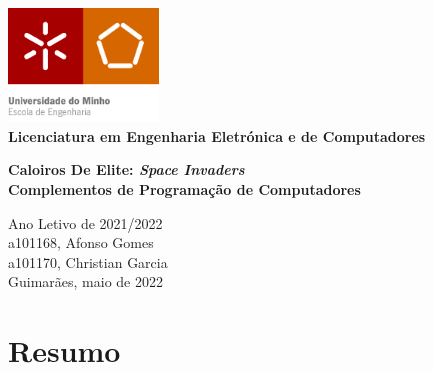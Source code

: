 \documentclass[a4paper,11pt]{article}
\begin{document}
\renewcommand{\listfigurename}{Índice de figuras}

\renewcommand{\listtablename}{Índice de tabelas}
    

\begin{titlepage}


   \begin{center}
        \includegraphics[width=0.3\textwidth]{0 - Capa/EEUMfinal.png}\\
        \vspace{0.2cm}
        \textbf{Licenciatura em Engenharia Eletrónica e de Computadores}
       \vfill
        
       \textbf{\Large{Caloiros De Elite: \textit{Space Invaders}}}\\
       \vspace{0.2cm}
       \textbf{\large{Complementos de Programação de Computadores}}\\

       \vfill
   

        Ano Letivo de 2021/2022\\
        \vspace{0.2pt}
        a101168, Afonso Gomes\\
        a101170, Christian Garcia\\
        \vspace{0.2pt}
        Guimarães, maio de 2022  \vspace{0.8cm}
   \end{center}        %
\end{titlepage}     %



\pagebreak




\setcounter{secnumdepth}{-1}
\section{Resumo}
\end{document}
